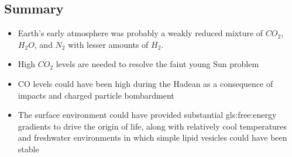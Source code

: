 \documentclass[]{article}
\begin{document}
\subsection{Summary}
\begin{itemize}
	\item Earth’s early atmosphere was 	probably a weakly reduced 	mixture of $CO_2$, $H_2O$, and $N_2$ with lesser amounts of $H_2$.
	\item High $CO_2$ levels are needed to resolve the faint young Sun 	problem 
	\item CO levels could have been high during the Hadean as a consequence of impacts and 	charged particle bombardment
	\item The surface environment could have provided substantial \gls{gls:free:energy}	gradients to drive the origin of life, along with relatively cool temperatures and freshwater 	environments in which simple lipid vesicles could have been 	stable
\end{itemize}

\printglossaries

 


\end{document}
